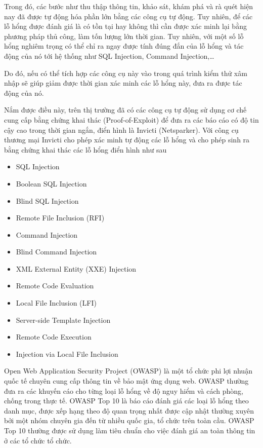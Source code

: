 \documentclass[./../main.tex]{subfiles}
\begin{document}
Trong đó, các bước như thu thập thông tin, khảo sát, khám phá và rà quét hiện nay đã được tự động hóa phần lớn bằng các công cụ tự động. Tuy nhiên, để các lỗ hổng được đánh giá là có tồn tại hay không thì cần được xác minh lại bằng phương pháp thủ công, làm tốn lượng lớn thời gian. Tuy nhiên, với một số lỗ hổng nghiêm trọng có thể chỉ ra ngay được tính đúng đắn của lỗ hổng và tác động của nó tới hệ thống như SQL Injection, Command Injection,\ldots

Do đó, nếu có thể tích hợp các công cụ này vào trong quá trình kiểm thử xâm nhập sẽ giúp giảm được thời gian xác minh các lỗ hổng này, đưa ra được tác động của nó.

Nắm được điều này, trên thị trường đã có các công cụ tự động sử dụng cơ
chế cung cấp bằng chứng khai thác (Proof-of-Exploit) để đưa ra các báo cáo có độ tin cậy cao trong thời gian ngắn, điển hình là Invicti (Netsparker). Với công cụ thương mại Invicti cho phép xác minh tự động các lỗ hổng và cho phép sinh ra bằng chứng khai thác các lỗ hổng điển hình như sau
\begin{itemize}
	\item SQL Injection
	\item Boolean SQL Injection
	\item Blind SQL Injection
	\item Remote File Inclusion (RFI)
	\item Command Injection
	\item Blind Command Injection
	\item XML External Entity (XXE) Injection
	\item Remote Code Evaluation
	\item Local File Inclusion (LFI)
	\item Server-side Template Injection
	\item Remote Code Execution
	\item Injection via Local File Inclusion
\end{itemize}

Open Web Application Security Project (OWASP) là một tổ chức phi lợi nhuận quốc tế chuyên cung cấp thông tin về bảo mật ứng dụng web. OWASP thường đưa ra các khuyến cáo cho từng loại lỗ hổng về độ nguy hiểm và cách phòng, chống trong thực tế. OWASP Top 10 là báo cáo đánh giá các loại lỗ hổng theo danh mục, được xếp hạng theo độ quan trọng nhất được cập nhật thường xuyên bởi một nhóm chuyên gia đến từ nhiều quốc gia, tổ chức trên toàn cầu. OWASP Top 10 thường được sử dụng làm tiêu chuẩn cho việc đánh giá an toàn thông tin ở các tổ chức tổ chức.
\end{document}
